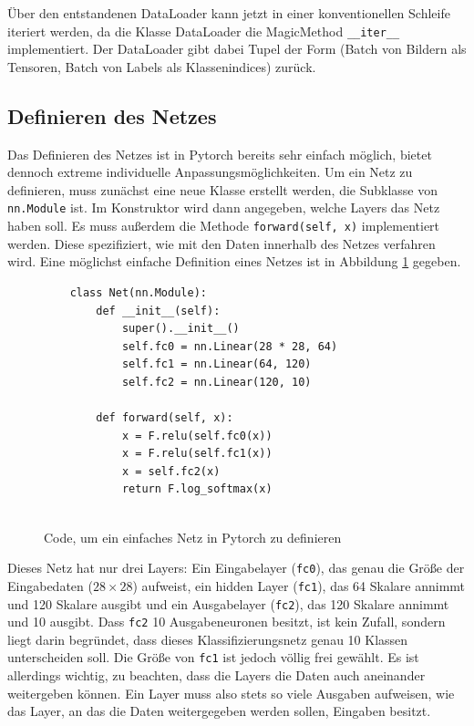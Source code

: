 \documentclass[11pt]{article}
\begin{document}
Über den entstandenen DataLoader kann jetzt in einer konventionellen Schleife iteriert werden, da die Klasse DataLoader die MagicMethod \texttt{__iter__} implementiert. Der DataLoader gibt dabei Tupel der Form (Batch von Bildern als Tensoren, Batch von Labels als Klassenindices) zurück.
\subsection{Definieren des Netzes}
Das Definieren des Netzes ist in Pytorch bereits sehr einfach möglich, bietet dennoch extreme individuelle Anpassungsmöglichkeiten. Um ein Netz zu definieren, muss zunächst eine neue Klasse erstellt werden, die Subklasse von \texttt{nn.Module} ist. Im Konstruktor wird dann angegeben, welche Layers das Netz haben soll. Es muss außerdem die Methode \texttt{forward(self, x)} implementiert werden. Diese spezifiziert, wie mit den Daten innerhalb des Netzes verfahren wird. Eine möglichst einfache Definition  eines Netzes ist in Abbildung \ref{Net_simple_definition} gegeben.
\newpage
\begin{figure}[h]
	\begin{verbatim}
	class Net(nn.Module):
		def __init__(self):
			super().__init__()
			self.fc0 = nn.Linear(28 * 28, 64)
			self.fc1 = nn.Linear(64, 120)
			self.fc2 = nn.Linear(120, 10)
	
		def forward(self, x):
			x = F.relu(self.fc0(x))
			x = F.relu(self.fc1(x))
			x = self.fc2(x)
			return F.log_softmax(x)
	
	\end{verbatim}
	\caption{Code, um ein einfaches Netz in Pytorch zu definieren}
	\label{Net_simple_definition}
\end{figure}
Dieses Netz hat nur drei Layers: Ein Eingabelayer (\texttt{fc0}), das genau die Größe der Eingabedaten ($28\times28$) aufweist, ein hidden Layer (\texttt{fc1}), das 64 Skalare annimmt und 120 Skalare ausgibt und ein Ausgabelayer (\texttt{fc2}), das 120 Skalare annimmt und 10 ausgibt. Dass \texttt{fc2} 10 Ausgabeneuronen besitzt, ist kein Zufall, sondern liegt darin begründet, dass dieses Klassifizierungsnetz genau 10 Klassen unterscheiden soll. Die Größe von \texttt{fc1} ist jedoch völlig frei gewählt. Es ist allerdings wichtig, zu beachten, dass die Layers die Daten auch aneinander weitergeben können. Ein Layer muss also stets so viele Ausgaben aufweisen, wie das Layer, an das die Daten weitergegeben werden sollen, Eingaben besitzt.\\
\end{document}
